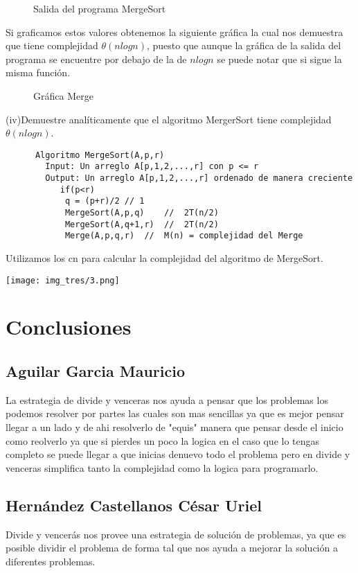 \documentclass[12pt,twoside]{article}
\newcommand{\addfigure}[4]{
        \begin{figure}[htbp!]
            \begin{center}	
                \fbox{\texttt{[image: \#2]}}
                \caption{#4}
                \label{#3}
            \end{center}
        \end{figure}
  }
\begin{document}
\addfigure{.25}{img_tres/SalidaMergeS}{fig:SM}{Salida del programa MergeSort}
Si graficamos estos valores obtenemos la siguiente gráfica la cual nos demuestra que tiene complejidad $\theta(nlogn)$, puesto que aunque la gráfica de la salida del programa se encuentre por debajo de la de $nlogn$ se puede notar que si sigue la misma función. 
\\
\addfigure{.9}{img_tres/GraficaMergeS}{fig:SM}{Gráfica Merge}
(iv)Demuestre analíticamente que el algoritmo MergerSort tiene complejidad $\theta(nlogn)$.
\begin{lstlisting}
      Algoritmo MergeSort(A,p,r)
    	Input: Un arreglo A[p,1,2,...,r] con p <= r
        Output: Un arreglo A[p,1,2,...,r] ordenado de manera creciente
           if(p<r)
           	q = (p+r)/2	// 1
            MergeSort(A,p,q)	//  2T(n/2)
            MergeSort(A,q+1,r)	//  2T(n/2)
            Merge(A,p,q,r)	//  M(n) = complejidad del Merge
   	\end{lstlisting}
    Utilizamos los cn para calcular la complejidad del algoritmo de MergeSort.
\\
\begin{center}

\texttt{[image: img\_tres/3.png]}
\end{center}

\section{Conclusiones}
\subsection*{Aguilar Garcia Mauricio}
La estrategia de divide y venceras nos ayuda a pensar que los problemas los podemos resolver por partes las cuales son mas sencillas ya que es mejor pensar llegar a un lado y de  ahi resolverlo de "equis" manera que pensar desde el inicio como reolverlo ya que si pierdes un poco la logica en el caso que lo tengas completo se puede llegar a que inicias denuevo todo el problema pero en divide y venceras simplifica tanto la complejidad como la logica para programarlo. 

\subsection*{Hernández Castellanos César Uriel}
Divide y vencerás nos provee una estrategia de solución de problemas, ya que es posible dividir el problema de forma tal que nos ayuda a mejorar la solución a diferentes problemas.\\
\end{document}
